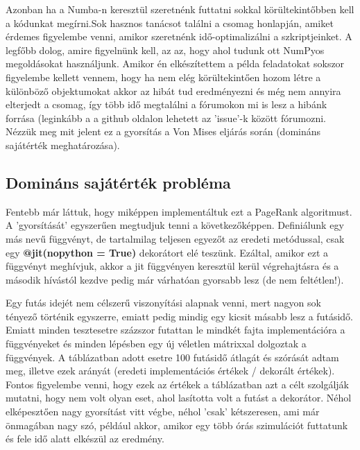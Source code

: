 \documentclass{article}
\theoremstyle{definition}
\theoremstyle{theorem}
\begin{document}
Azonban ha a Numba-n keresztül szeretnénk futtatni sokkal körültekintőbben kell a kódunkat megírni.Sok hasznos tanácsot találni a csomag honlapján, amiket érdemes figyelembe venni, amikor szeretnénk idő-optimalizálni a szkriptjeinket. A legfőbb dolog, amire figyelnünk kell, az az, hogy ahol tudunk ott NumPyos megoldásokat használjunk. Amikor én elkészítettem a példa feladatokat sokszor figyelembe kellett vennem, hogy ha nem elég körültekintően hozom létre a különböző objektumokat akkor az hibát tud eredményezni és még nem annyira elterjedt a csomag, így több idő megtalálni a fórumokon mi is lesz a hibánk forrása (leginkább a a github oldalon lehetett az 'issue'-k között fórumozni.\newline
Nézzük meg mit jelent ez a gyorsítás a Von Mises eljárás során (domináns sajátérték meghatározása).
\subsection{Domináns sajátérték probléma}
Fentebb már láttuk, hogy miképpen implementáltuk ezt a PageRank algoritmust. A 'gyorsítását' egyszerűen megtudjuk tenni a következőképpen. Definiálunk egy más nevű függvényt, de tartalmilag teljesen egyezőt az eredeti metódussal, csak egy \textbf{@jit(nopython = True)} dekorátort elé teszünk. Ezáltal, amikor ezt a függvényt meghívjuk, akkor a jit függvényen keresztül kerül végrehajtásra és a második hívástól kezdve pedig már várhatóan gyorsabb lesz (de nem feltétlen!).

Egy futás idejét nem célszerű viszonyítási alapnak venni, mert nagyon sok tényező történik egyszerre, emiatt pedig mindig egy kicsit másabb lesz a futásidő. Emiatt minden tesztesetre százszor futattan le mindkét fajta implementációra a függvényeket és minden lépésben egy új véletlen mátrixxal dolgoztak a függvények.\newline
A táblázatban adott esetre 100 futásidő átlagát és szórását adtam meg, illetve ezek arányát (eredeti implementációs értékek / dekorált értékek). Fontos figyelembe venni, hogy ezek az értékek a táblázatban azt a célt szolgálják mutatni, hogy nem volt olyan eset, ahol lasította volt a futást a dekorátor. Néhol elképesztően nagy gyorsítást vitt végbe, néhol 'csak' kétszeresen, ami már önmagában nagy szó, például akkor, amikor egy több órás szimulációt futtatunk és fele idő alatt elkészül az eredmény.
\end{document}
